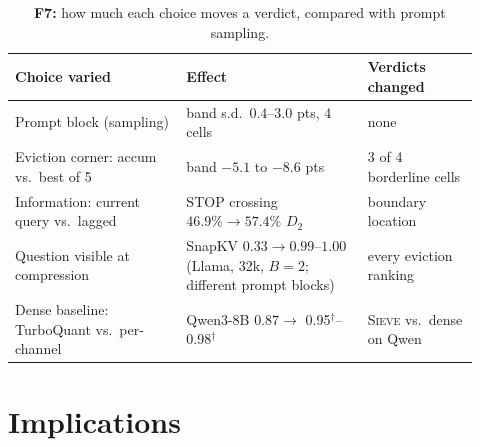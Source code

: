 \documentclass{article}
\newcommand{\est}[1]{{\color{estcol}#1$^{\dagger}$}}
\newcommand{\sieve}{\textsc{Sieve}}
\theoremstyle{definition}
\begin{document}
\begin{table}[t]
\centering
\small
\setlength{\tabcolsep}{4pt}
\caption{\textbf{F7:} how much each choice moves a verdict, compared with prompt sampling.}
\label{tab:contract}
\begin{tabular}{@{}p{0.34\linewidth}p{0.36\linewidth}p{0.22\linewidth}@{}}
\toprule
\textbf{Choice varied} & \textbf{Effect} & \textbf{Verdicts changed} \\
\midrule
Prompt block (sampling) & band s.d.\ $0.4$--$3.0$ pts, 4 cells & none \\
Eviction corner: accum vs.\ best of 5 & band $-5.1$ to $-8.6$ pts & 3 of 4 borderline cells \\
Information: current query vs.\ lagged & STOP crossing $46.9\%\to57.4\%$ $D_2$ & boundary location \\
Question visible at compression & SnapKV $0.33\to0.99$--$1.00$ (Llama, 32k, $B{=}2$; different prompt blocks) & every eviction ranking \\
Dense baseline: TurboQuant vs.\ per-channel & Qwen3-8B $0.87\to$ \est{0.95}--\est{0.98} & \sieve{} vs.\ dense on Qwen \\
\bottomrule
\end{tabular}
\vspace{-2mm}
\end{table}


\section{Implications}
\label{sec:implications}
\end{document}
